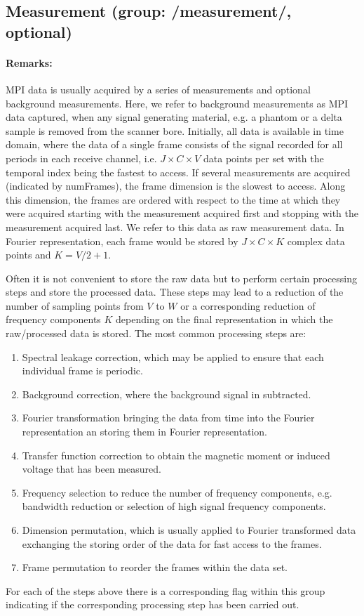 \documentclass[landscape,a4paper]{article} %
\newcommand{\inlvar}[1]{{\ttfamily#1}}
\begin{document}
\subsection{Measurement (group: \inlvar{/measurement/}, optional)}
\begin{multicols}{2}

\paragraph{Remarks:}
MPI data is usually acquired by a series of measurements and optional background measurements. Here, we refer to background measurements as MPI data captured, when any signal generating material, e.g. a phantom or a delta sample is removed from the scanner bore. Initially, all data is available in time domain, where the data of a single frame consists of the signal recorded for all periods in each receive channel, i.e. $J \times C \times V$ data points per set with the temporal index being the fastest to access.  If several measurements are acquired (indicated by \inlvar{numFrames}), the frame dimension is the slowest to access. Along this dimension, the frames are ordered with respect to the time at which they were acquired starting with the measurement acquired first and stopping with the measurement acquired last. We refer to this data as raw measurement data. In Fourier representation, each frame would be stored by $J \times C\times K$ complex data points and $K = V/2 +1$.

Often it is not convenient to store the raw data but to perform certain processing steps and store the processed data. These steps may lead to a reduction of the number of sampling points from $V$ to $W$ or a corresponding reduction of frequency components $K$ depending on the final representation in which the raw/processed data is stored. The most common processing steps are:
\begin{enumerate}
	\item Spectral leakage correction, which may be applied to ensure that each individual frame is periodic.
	\item Background correction, where the background signal in subtracted.
	\item Fourier transformation bringing the data from time into the Fourier representation an storing them in Fourier representation.
	\item Transfer function correction to obtain the magnetic moment or induced voltage that has been measured.
	\item Frequency selection to reduce the number of frequency components, e.g. bandwidth reduction or selection of high signal frequency components.
	\item Dimension permutation, which is usually applied to Fourier transformed data exchanging the storing order of the data for fast access to the frames.
	\item Frame permutation to reorder the frames within the data set.
\end{enumerate}
For each of the steps above there is a corresponding flag within this group indicating if the corresponding processing step has been carried out. 


\end{multicols}
\end{document}
